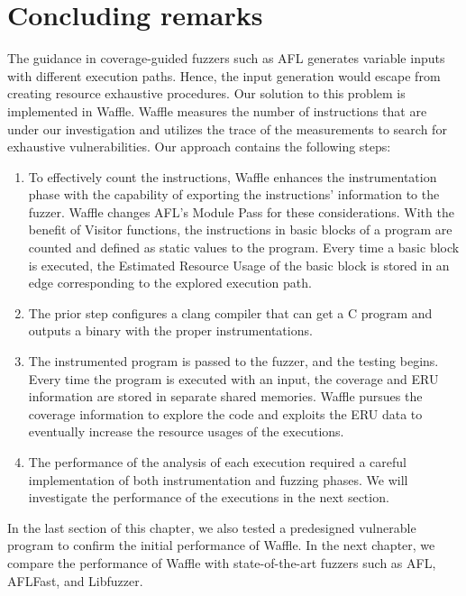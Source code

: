 \section{Concluding remarks}

The guidance in coverage-guided fuzzers such as AFL generates variable inputs with different execution paths. Hence, the input generation would escape from creating resource exhaustive procedures. Our solution to this problem is implemented in Waffle. Waffle measures the number of instructions that are under our investigation and utilizes the trace of the measurements to search for exhaustive vulnerabilities. Our approach contains the following steps: 

\begin{enumerate}
    \item To effectively count the instructions, Waffle enhances the instrumentation phase with the capability of exporting the instructions' information to the fuzzer. Waffle changes AFL's Module Pass for these considerations. With the benefit of Visitor functions, the instructions in basic blocks of a program are counted and defined as static values to the program. Every time a basic block is executed, the Estimated Resource Usage of the basic block is stored in an edge corresponding to the explored execution path.
    \item The prior step configures a clang compiler that can get a C program and outputs a binary with the proper instrumentations.
    \item The instrumented program is passed to the fuzzer, and the testing begins. Every time the program is executed with an input, the coverage and ERU information are stored in separate shared memories. Waffle pursues the coverage information to explore the code and exploits the ERU data to eventually increase the resource usages of the executions.
    \item The performance of the analysis of each execution required a careful implementation of both instrumentation and fuzzing phases. We will investigate the performance of the executions in the next section.
\end{enumerate}

In the last section of this chapter, we also tested a predesigned vulnerable program to confirm the initial performance of Waffle. In the next chapter, we compare the performance of Waffle with state-of-the-art fuzzers such as AFL, AFLFast, and Libfuzzer.